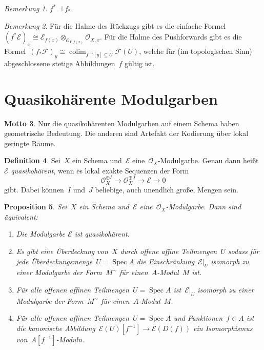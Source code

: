\documentclass[a4paper,ngerman,12pt]{scrartcl}
\theoremstyle{definition}
\newtheorem{defn}{Definition}[section]
\newtheorem{motto}[defn]{Motto}
\theoremstyle{plain}
\newtheorem{prop}[defn]{Proposition}
\theoremstyle{remark}
\newtheorem{rem}[defn]{Bemerkung}
\newcommand{\E}{\mathcal{E}}
\newcommand{\F}{\mathcal{F}}
\renewcommand{\O}{\mathcal{O}}
\newcommand{\lra}{\longrightarrow}
\DeclareMathOperator{\Spec}{Spec}
\DeclareMathOperator{\colim}{colim}
\begin{document}
\begin{rem}$f^* \dashv f_*$.\end{rem}

\begin{rem}Für die Halme des Rückzugs gibt es die einfache Formel~$(f^*\E)_x
\cong \E_{f(x)} \otimes_{\O_{Y,f(x)}} \O_{X,x}$. Für die Halme des Pushforwards
gibt es die Formel~$(f_*\F)_y \cong \colim_{f^{-1}[y] \subseteq U} \F(U)$,
welche für (im topologischen Sinn) abgeschlossene stetige Abbildungen~$f$
gültig ist.\end{rem}


\section{Quasikohärente Modulgarben}

\begin{motto}Nur die quasikohärenten Modulgarben auf einem Schema haben
geometrische Bedeutung. Die anderen sind Artefakt der Kodierung über lokal
geringte Räume.\end{motto}

\begin{defn}Sei~$X$ ein Schema und~$\E$ eine~$\O_X$-Modulgarbe. Genau dann
heißt~$\E$ \emph{quasikohärent}, wenn es lokal exakte Sequenzen der Form
\[ \O_X^{\oplus I} \lra \O_X^{\oplus J} \lra \E \lra 0 \]
gibt. Dabei können~$I$ und~$J$ beliebige, auch unendlich große, Mengen sein.
\end{defn}

\begin{prop}Sei~$X$ ein Schema und~$\E$ eine~$\O_X$-Modulgarbe. Dann sind
äquivalent:
\begin{enumerate}
\item Die Modulgarbe $\E$ ist quasikohärent.
\item Es gibt eine Überdeckung von~$X$ durch offene affine Teilmengen~$U$ sodass
für jede Überdeckungsmenge~$U = \Spec A$ die Einschränkung~$\E|_U$ isomorph zu
einer Modulgarbe der Form~$M^\sim$ für einen~$A$-Modul~$M$ ist.
\item Für alle offenen affinen Teilmengen~$U = \Spec A$ ist~$\E|_U$ isomorph zu einer
Modulgarbe der Form~$M^\sim$ für einen~$A$-Modul~$M$.
\item Für alle offenen affinen Teilmengen~$U = \Spec A$ und Funktionen~$f \in
A$ ist die kanonische Abbildung~$\E(U)[f^{-1}] \to \E(D(f))$ ein Isomorphismus
von~$A[f^{-1}]$-Moduln.
\end{enumerate}
\end{prop}
\end{document}
